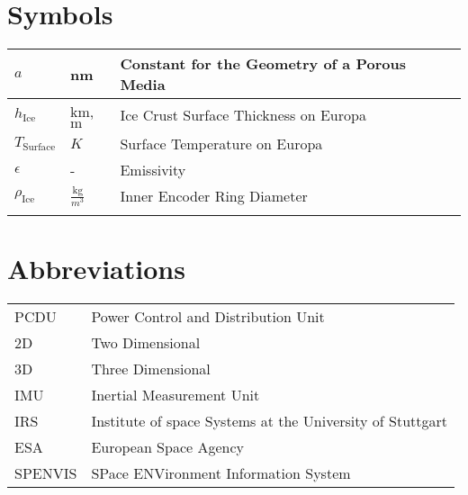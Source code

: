 \chapter*{Symbols}

\begin{longtable}[c]{lll}
  $a$                      & nm                                          & Constant for the Geometry of a Porous Media   \\
\endfirsthead
%
\endhead
%


$h_\text{Ice}$           & $\text{km}$,$\text{m}$                      & Ice Crust Surface Thickness on Europa         \\
$T_\text{Surface}$       & $K$                                         & Surface Temperature on Europa                 \\
$\epsilon$               & -                                           & Emissivity                                    \\
$\rho_\text{Ice}$       & $\frac{\text{kg}}{m^3}$                      & Inner Encoder Ring Diameter                   \\
   

\label{tab:my-table}\\
\end{longtable}




\chapter*{Abbreviations}
\begin{table}[htb]
\begin{tabular}[l]{ll}
PCDU      & Power Control and Distribution Unit \\
2D		& Two Dimensional \\
3D		& Three Dimensional \\
IMU     & Inertial Measurement Unit \\
IRS     & Institute of space Systems at the University of Stuttgart \\
ESA		&	European Space Agency	\\
SPENVIS	&	SPace ENVironment Information System	\\

\end{tabular}
\end{table}


